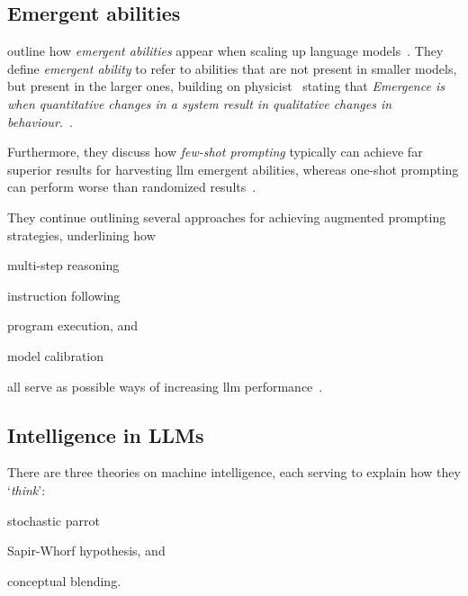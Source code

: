 \subsection{Emergent abilities}\label{sec:emergentAbilities}

\citeauthor{emergentabilitiesLLM} outline how \textit{emergent abilities} appear
when scaling up language models~\cite[1]{emergentabilitiesLLM}. They define
\textit{emergent ability} to refer to abilities that are not present in smaller
models, but present in the larger ones\cite[1]{emergentabilitiesLLM}, building
on physicist~\citeauthor{anderson1972more} stating that \textit{Emergence is
    when quantitative changes in a system result in qualitative changes in
    behaviour.}~\cite[2]{emergentabilitiesLLM}.

Furthermore, they discuss how \textit{few-shot prompting} typically can achieve
far superior results for harvesting \acrshort{llm} emergent abilities, whereas
one-shot prompting can perform worse than randomized
results~\cite[3-4]{emergentabilitiesLLM}.

They continue outlining several approaches for achieving augmented prompting
strategies, underlining how \begin{inparaenum}
    \item multi-step reasoning
    \item instruction following
    \item program execution,
    and
    \item model calibration
\end{inparaenum}
all serve as possible ways of increasing \acrshort{llm} performance~\cite[5]{emergentabilitiesLLM}.


\subsection{Intelligence in LLMs}\label{sec:llmIntelligence}

There are three theories on machine intelligence, each serving to
explain how they `\textit{think}': \begin{inparaenum}
    \item stochastic parrot
    \item Sapir-Whorf hypothesis,
    and
    \item conceptual blending.
\end{inparaenum}

